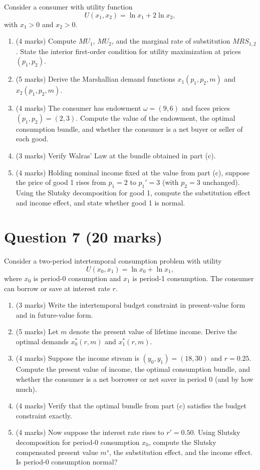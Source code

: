 \documentclass[12pt]{article}
\begin{document}
Consider a consumer with utility function
\[
U(x_1,x_2)=\ln x_1+2\ln x_2,
\]
with $x_1>0$ and $x_2>0$.

\begin{enumerate}[label=(\alph*)]
\item (4 marks) Compute $MU_1$, $MU_2$, and the marginal rate of substitution $MRS_{1,2}$. State the interior first-order condition for utility maximization at prices $(p_1,p_2)$.
\item (5 marks) Derive the Marshallian demand functions $x_1(p_1,p_2,m)$ and $x_2(p_1,p_2,m)$.
\item (4 marks) The consumer has endowment $\omega=(9,6)$ and faces prices $(p_1,p_2)=(2,3)$. Compute the value of the endowment, the optimal consumption bundle, and whether the consumer is a net buyer or seller of each good.
\item (3 marks) Verify Walras' Law at the bundle obtained in part (c).
\item (4 marks) Holding nominal income fixed at the value from part (c), suppose the price of good 1 rises from $p_1=2$ to $p_1'=3$ (with $p_2=3$ unchanged). Using the Slutsky decomposition for good 1, compute the substitution effect and income effect, and state whether good 1 is normal.
\end{enumerate}

\medskip

\newpage
\section*{Question 7 (20 marks)}

Consider a two-period intertemporal consumption problem with utility
\[
U(x_0,x_1)=\ln x_0+\ln x_1,
\]
where $x_0$ is period-0 consumption and $x_1$ is period-1 consumption. The consumer can borrow or save at interest rate $r$.

\begin{enumerate}[label=(\alph*)]
\item (3 marks) Write the intertemporal budget constraint in present-value form and in future-value form.
\item (5 marks) Let $m$ denote the present value of lifetime income. Derive the optimal demands $x_0^*(r,m)$ and $x_1^*(r,m)$.
\item (4 marks) Suppose the income stream is $(y_0,y_1)=(18,30)$ and $r=0.25$. Compute the present value of income, the optimal consumption bundle, and whether the consumer is a net borrower or net saver in period 0 (and by how much).
\item (4 marks) Verify that the optimal bundle from part (c) satisfies the budget constraint exactly.
\item (4 marks) Now suppose the interest rate rises to $r'=0.50$. Using Slutsky decomposition for period-0 consumption $x_0$, compute the Slutsky compensated present value $m^s$, the substitution effect, and the income effect. Is period-0 consumption normal?
\end{enumerate}
\end{document}
